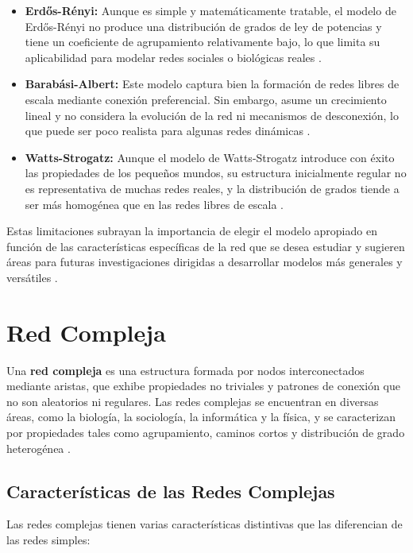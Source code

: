 \begin{itemize}
    \item \textbf{Erdős-Rényi:} Aunque es simple y matemáticamente tratable, el modelo de Erdős-Rényi no produce una distribución de grados de ley de potencias y tiene un coeficiente de agrupamiento relativamente bajo, lo que limita su aplicabilidad para modelar redes sociales o biológicas reales .
    \item \textbf{Barabási-Albert:} Este modelo captura bien la formación de redes libres de escala mediante conexión preferencial. Sin embargo, asume un crecimiento lineal y no considera la evolución de la red ni mecanismos de desconexión, lo que puede ser poco realista para algunas redes dinámicas .
    \item \textbf{Watts-Strogatz:} Aunque el modelo de Watts-Strogatz introduce con éxito las propiedades de los pequeños mundos, su estructura inicialmente regular no es representativa de muchas redes reales, y la distribución de grados tiende a ser más homogénea que en las redes libres de escala .
\end{itemize}

Estas limitaciones subrayan la importancia de elegir el modelo apropiado en función de las características específicas de la red que se desea estudiar y sugieren áreas para futuras investigaciones dirigidas a desarrollar modelos más generales y versátiles .

\section{Red Compleja}

Una \textbf{red compleja} es una estructura formada por nodos interconectados mediante aristas, que exhibe propiedades no triviales y patrones de conexión que no son aleatorios ni regulares. Las redes complejas se encuentran en diversas áreas, como la biología, la sociología, la informática y la física, y se caracterizan por propiedades tales como agrupamiento, caminos cortos y distribución de grado heterogénea \citep{newman2010networks}.

\subsection{Características de las Redes Complejas}

Las redes complejas tienen varias características distintivas que las diferencian de las redes simples:

